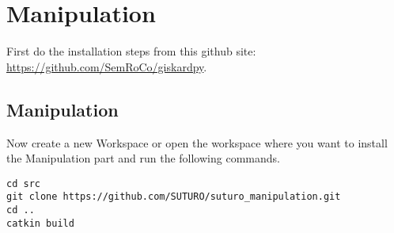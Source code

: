 \documentclass[main.tex]{subfiles}
\begin{document}
\section{Manipulation}

First do the installation steps from this github site:\\
	\url{https://github.com/SemRoCo/giskardpy}.\\
	
	\subsection{Manipulation}
Now create a new Workspace or open the workspace where you want to install the Manipulation part and run the following commands.	
\begin{lstlisting}
cd src
git clone https://github.com/SUTURO/suturo_manipulation.git
cd ..
catkin build  \end{lstlisting}
	
	
\end{document}
